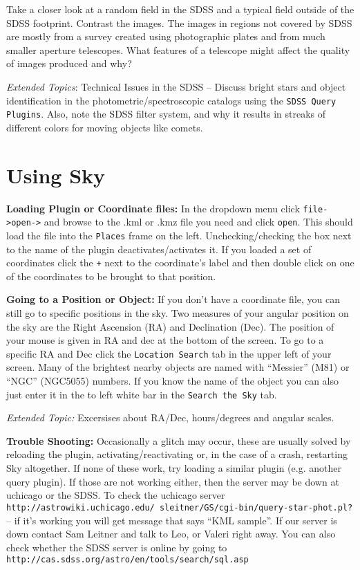 \documentclass[12pt]{article}
\begin{document}
Take a closer look at a random field in the SDSS and a typical field outside of the SDSS footprint. Contrast the images. The images in regions not covered by SDSS are mostly from a survey created using photographic plates and from much smaller aperture telescopes. What features of a telescope might affect the quality of images produced and why?

\noindent
\textit{Extended Topics}: 
Technical Issues in the SDSS -- 
Discuss bright stars and object identification in the photometric/spectroscopic catalogs using the \texttt{SDSS Query Plugins}.
Also, note the SDSS filter system, and why it results in streaks of different colors for moving objects like comets.


\section*{Using Sky}


\textbf{Loading Plugin or Coordinate files:} \newline
\noindent In the dropdown menu click \texttt{file->open->} and browse to the .kml or .kmz file you need and click \texttt{open}. This should load the file into the \texttt{Places} frame on the left. Unchecking/checking the box next to the name of the plugin deactivates/activates it. If you loaded a set of coordinates click the \texttt{+} next to the coordinate's label and then double click on one of the coordinates to be brought to that position. 



\noindent \textbf{Going to a Position or Object:} \newline
If you don't have a coordinate file, you can still go to specific positions in the sky. Two measures of your angular position on the sky are the Right Ascension (RA) and Declination (Dec). The position of your mouse is given in RA and dec at the bottom of the screen. To go to a specific RA and Dec click the \texttt{Location Search} tab in the upper left of your screen. Many of the brightest nearby objects are named with ``Messier'' (M81) or ``NGC'' (NGC5055) numbers. If you know the name of the object you can also just enter it in the to left white bar in the \texttt{Search the Sky} tab.

\textit{Extended Topic:} Excersises about RA/Dec, hours/degrees and angular scales.

\noindent \textbf{Trouble Shooting:} \newline
Occasionally a glitch may occur, these are usually solved by reloading the plugin, activating/reactivating or, in the case of a crash, restarting Sky altogether.
If none of these work, try loading a similar plugin (e.g. another query plugin). If those are not working either, then the server may be down at uchicago or the SDSS. 
To check the uchicago server \texttt{http://astrowiki.uchicago.edu/~sleitner/GS/cgi-bin/query-star-phot.pl?} -- if it's working you will get message that says ``KML sample''. If our server is down contact Sam Leitner and talk to Leo, or Valeri right away. 
You can also check whether the SDSS server is online by going to \texttt{http://cas.sdss.org/astro/en/tools/search/sql.asp} 
\end{document}
